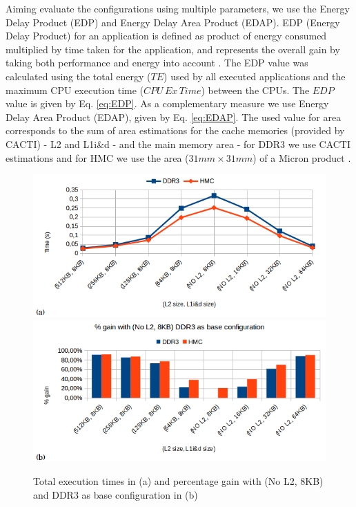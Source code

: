 \documentclass{sig-alternate-05-2015}
\begin{document}
Aiming evaluate the configurations using multiple parameters, we use
the Energy Delay Product (EDP) and Energy Delay Area Product (EDAP).
{EDP (Energy Delay Product) for an application is
defined as product of energy consumed multiplied by time taken for
the application, and represents the overall gain by taking both performance
and energy into account \cite{suresh2014evaluation}. The EDP value
was calculated using the total energy ($TE$) used by all executed
applications and the maximum CPU execution time ($CPU\,Ex\,Time$)
between the CPUs. The $EDP$ value is given by Eq. \ref{eq:EDP}.
As a complementary measure we use }Energy Delay Area Product (EDAP),
given by Eq. \ref{eq:EDAP}. The used value for area corresponds to
the sum of area estimations for the cache memories (provided by CACTI)
- L2 and L1i\&d - and the main memory area - for DDR3 we use CACTI
estimations and for HMC we use the area ($31mm\times31mm$) of a Micron
product \cite{Micron:HMC_DataSheet:2010}. 
\begin{figure}
	\centering
	\includegraphics[scale=0.38]{images/graficos/TotalExecTime_}\includegraphics[scale=0.38]{images/graficos/exec_time_gain_perc_}
	
	\caption{\label{fig:Total-Execution-Time}Total execution times in (a) and
		percentage gain with (No L2, 8KB) and DDR3 as base configuration in (b)}
\end{figure}
\end{document}
